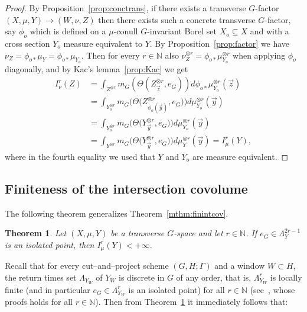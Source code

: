 \documentclass{amsart}
\numberwithin{equation}{subsection}
\newtheorem{thm}{Theorem}[section]
\theoremstyle{remark}
\begin{document}
\begin{proof}
By Proposition~\ref{prop:conctrans}, if there exists a transverse \(G\)-factor \(\left(X,\mu,Y\right)\to\left(W,\nu,Z\right)\) then there exists such a concrete transverse \(G\)-factor, say \(\phi_{o}\) which is defined on a \(\mu\)-conull \(G\)-invariant Borel set \(X_{o}\subseteq X\) and with a cross section \(Y_{o}\) measure equivalent to \(Y\). By Proposition~\ref{prop:factor} we have \(\nu_{Z}=\phi_{o\ast}\mu_{Y}=\phi_{o\ast}\mu_{Y_{o}}\). Then for every \(r\in\mathbb{N}\) also \(\nu_{Z}^{\otimes r}=\phi_{o\ast}\mu_{Y_{o}}^{\otimes r}\) when applying \(\phi_{o}\) diagonally, and by Kac's lemma~\ref{prop:Kac} we get
\begin{align*}
I_{\nu}^{r}\left(Z\right)	
&=\int_{Z^{\otimes r}}m_{G}\left(\Theta\left(Z_{\vec{z}}^{\otimes r},e_{G}\right)\right)d\phi_{o\ast}\mu_{Y_{o}}^{\otimes r}\left(\vec{z}\right)\\
&=\int_{Y_{o}^{\otimes r}}m_{G}\big(\Theta\big(Z_{\phi_{o}\left(\vec{y}\right)}^{\otimes r},e_{G}\big)\big)d\mu_{Y_{o}}^{\otimes r}\left(\vec{y}\right)\\
&=\int_{Y_{o}^{\otimes r}}m_{G}\big(\Theta\big(Y_{\vec{y}}^{\otimes r},e_{G}\big)\big)d\mu_{Y_{o}}^{\otimes r}\left(\vec{y}\right)\\
&=\int_{Y^{\otimes r}}m_{G}\big(\Theta\big(Y_{\vec{y}}^{\otimes r},e_{G}\big)\big)d\mu_{Y}^{\otimes r}\left(\vec{y}\right)=I_{\mu}^{r}\left(Y\right),
\end{align*}
where in the fourth equality we used that \(Y\) and \(Y_{o}\) are measure equivalent.
\end{proof}

\subsection{Finiteness of the intersection covolume}

The following theorem generalizes Theorem~\ref{mthm:finintcov}.

\begin{thm}\label{thm:finiteiv}
Let \(\left(X,\mu,Y\right)\) be a transverse \(G\)-space and let \(r\in\mathbb{N}\). If \(e_{G}\in\Lambda_{Y}^{2r-1}\) is an isolated point, then \(I_{\mu}^{r}\left(Y\right)<+\infty\).
\end{thm}

Recall that for every cut--and--project scheme \(\left(G,H;\Gamma\right)\) and a window \(W\subset H\), the return times set \(\Lambda_{Y_{W}}\) of \(Y_{W}\) is discrete in \(G\) of any order, that is, \(\Lambda_{Y_{W}}^{r}\) is locally finite (and in particular \(e_{G}\in\Lambda_{Y_{W}}^{r}\) is an isolated point) for all \(r\in\mathbb{N}\) (see~\cite[Proposition 2.13]{BjHa2018}, whose proofs holds for all \(r\in\mathbb{N}\)). Then from Theorem~\ref{thm:finiteiv} it immediately follows that:
\end{document}
